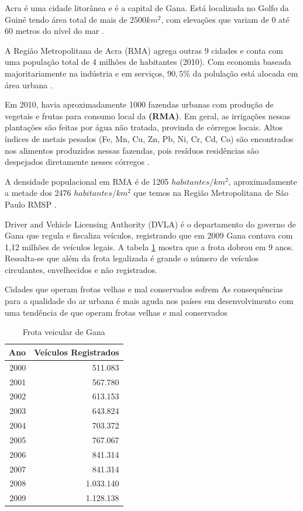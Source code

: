 Acra é uma cidade litorânea e é a capital de Gana. Está localizada 
no Golfo da Guiné tendo área total de mais de  $2500 km^2$, com elevações que 
variam de 0 até 60 metros do nível do mar \citep{ARKU2008}.

A Região Metropolitana de Acra (RMA) agrega outras 9 cidades
e conta com uma população total de 4 milhões de habitantes (2010). 
Com economia baseada majoritariamente na indústria e em serviços, 
$90,5\%$ da polulação está alocada em área urbana \citep{ghanacensus2013}.

Em 2010, havia aproximadamente 1000 fazendas urbanas com produção de vegetais e
frutas para consumo local da \textbf{(RMA)}. Em geral, as irrigações nessas plantações
são feitas por água não tratada, provinda de córregos locais. 
Altos índices de metais pesados (Fe, Mn, Cu, Zn, Pb, Ni, Cr, Cd, Co)
são encontrados nos alimentos produzidos nessas fazendas, pois resíduos
residências são despejados diretamente nesses córregos \citep{lente2014}.

A densidade populacional em RMA é de 1205 $habitantes/km^2$, 
aproximadamente a metade dos 2476 $habitantes/km^2$ que temos na 
Região Metropolitana de São Paulo RMSP \citep{ibge2011}. 

Driver and Vehicle Licensing Authority (DVLA) é o
departamento do governo de Gana que regula e fiscaliza veículos, 
registrando que em 2009 Gana contava com 1,12 milhões de veículos legais. 
A tabela \ref{table:dvla} mostra que a frota dobrou em 9 anos.
Ressalta-se que além da frota legalizada é grande o número de veículos circulantes, 
envelhecidos e não registrados.

Cidades que operam frotas velhas e mal conservados sofrem 
As consequências para a qualidade do ar urbana é mais aguda nos países em desenvolvimento
com uma tendência de que operam frotas velhas e mal conservados

\begin{table}[H]
 \centering
  \begin{tabular}{rr}
  \hline
  Ano & Veículos Registrados \\ 
  \hline
  2000 & 511.083 \\ 
  2001 & 567.780 \\ 
  2002 & 613.153 \\ 
  2003 & 643.824 \\ 
  2004 & 703.372 \\ 
  2005 & 767.067 \\ 
  2006 & 841.314 \\ 
  2007 & 841.314 \\ 
  2008 & 1.033.140 \\ 
  2009 & 1.128.138 \\ 
  \hline
  \end{tabular}
  \caption{Frota veicular de Gana \citep{dvla} \label{table:dvla}}
\end{table}

